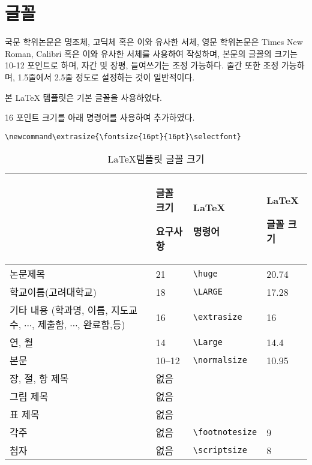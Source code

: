 \documentclass[11pt]{report}
\newcommand\extrasize{\fontsize{16pt}{16pt}\selectfont}  %
\begin{document}
\newpage



\section{글꼴} \label{sec:font}
국문 학위논문은 명조체, 고딕체 혹은 이와 유사한 서체, 영문 학위논문은 Times New Roman, Calibri 혹은 이와 유사한 서체를 사용하여 작성하며, 본문의 글꼴의 크기는 10-12 포인트로 하며, 자간 및 장평, 들여쓰기는 조정 가능하다. 줄간 또한 조정 가능하며, 1.5줄에서 2.5줄 정도로 설정하는 것이 일반적이다. \par 
본 \LaTeX{} 템플릿은 기본 글꼴을 사용하였다.\par 
16 포인트 크기를 아래 명령어를 사용하여 추가하였다. \par
\verb|\newcommand\extrasize{\fontsize{16pt}{16pt}\selectfont}| 


\begin{table}
\caption{\LaTeX 템플릿 글꼴 크기}\label{tab:font size}
\bigskip
\begin{tabular}{>{\centering\arraybackslash}p{5.4cm}p{2.4cm}p{2.5cm}p{1.6cm}}
\toprule
&글꼴 크기 \par 요구사항 & \LaTeX \par 명령어 & \LaTeX \par 글꼴 크기 \\\midrule
논문제목			&21&\verb|\huge| & 20.74 \\\midrule
학교이름(고려대학교)
					&18&\verb|\LARGE| & 17.28 \\\midrule
기타 내용 (학과명, 이름, 지도교수, \(\cdots\), 제출함, \(\cdots\), 완료함,등)	
					&16&\verb|\extrasize| & 16  \\\midrule
연, 월	&14&\verb|\Large| & 14.4 \\\midrule
본문			&10--12&\verb|\normalsize| & 10.95 \\\midrule
장, 절, 항 제목				&없음&\\\midrule
그림 제목			&없음&\\\midrule
표 제목			&없음&\\\midrule
각주 			&없음&\verb|\footnotesize| & 9 \\\midrule
첨자 			&없음&\verb|\scriptsize| & 8 \\\bottomrule


\end{tabular}
\end{table}
\end{document}
